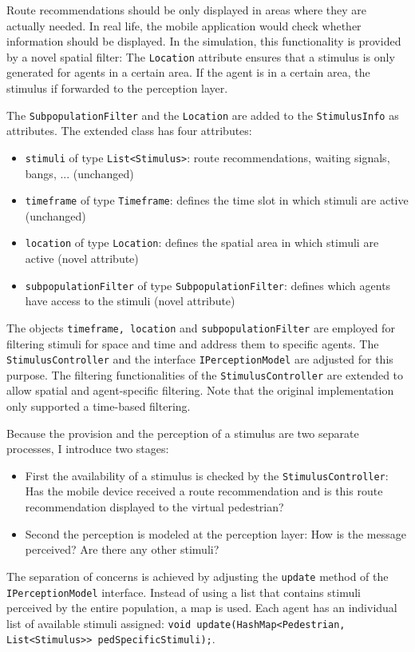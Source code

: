 Route recommendations should be only displayed in areas where they are actually needed. In real life, the mobile application would check whether information should be displayed. In the simulation, this functionality is provided by a novel spatial filter: The \lstinline{Location} attribute ensures that a stimulus is only generated for agents in a certain area. If the agent is in a certain area, the stimulus if forwarded to the perception layer.

The \lstinline{SubpopulationFilter} and the \lstinline{Location} are added to the \lstinline{StimulusInfo} as attributes. The extended class has four attributes:

\begin{itemize}
\item \lstinline{stimuli} of type \lstinline{List<Stimulus>}: route recommendations, waiting signals, bangs, ... (unchanged)
\item \lstinline{timeframe} of type \lstinline{Timeframe}: defines the time slot in which stimuli are active (unchanged)
\item \lstinline{location} of type \lstinline{Location}: defines the spatial area in which stimuli are active (novel attribute)
\item \lstinline{subpopulationFilter} of type \lstinline{SubpopulationFilter}: defines which agents have access to the stimuli (novel attribute)
\end{itemize}



The objects \lstinline{timeframe, location} and \lstinline{subpopulationFilter} are employed for filtering stimuli for space and time and address them to specific agents. The \lstinline{StimulusController} and the interface \lstinline{IPerceptionModel} are adjusted for this purpose. The filtering functionalities of the \lstinline{StimulusController} are extended to allow spatial and agent-specific filtering. Note that the original implementation only supported a time-based filtering. 

Because the provision  and the perception of a stimulus are two separate processes, I introduce two stages:
\begin{itemize}
\item First the availability of a stimulus is checked by the \lstinline{StimulusController}: Has the mobile device received a route recommendation and is this route recommendation displayed to the virtual pedestrian?
\item Second the perception is modeled at the perception layer: How is the message perceived? Are there any other stimuli?
\end{itemize}
The separation of concerns is achieved by adjusting the \lstinline{update} method of the \lstinline{IPerceptionModel} interface. Instead of using a list that contains stimuli perceived by the entire population, a map is used. Each agent has an individual list of available stimuli assigned: \lstinline{void update(HashMap<Pedestrian, List<Stimulus>> pedSpecificStimuli);}. 




